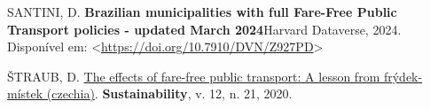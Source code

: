 \documentclass[12pt, a4paper, twoside]{article}
\numberwithin{equation}{subsection} %
\newlength{\cslhangindent}
\newlength{\cslentryspacingunit} %
\newenvironment{CSLReferences}[2] %
 {%
  \setlength{\parindent}{0pt}
  \ifodd #1
  \let\oldpar\par
  \def\par{\hangindent=\cslhangindent\oldpar}
  \fi
  \setlength{\parskip}{#2\cslentryspacingunit}
 }%
 {}
\begin{document}
\begin{CSLReferences}{0}{0}
\leavevmode{}%
SANTINI, D. \textbf{{Brazilian municipalities with full Fare-Free Public
Transport policies - updated March 2024}}Harvard Dataverse, 2024.
Disponível em:
\textless{}\url{https://doi.org/10.7910/DVN/Z927PD}\textgreater{}

\leavevmode{}%
ŠTRAUB, D. \href{https://doi.org/10.3390/su12219111}{The effects of
fare-free public transport: A lesson from frýdek-místek (czechia)}.
\textbf{Sustainability}, v. 12, n. 21, 2020.

\end{CSLReferences}




\appendix





\end{document}
